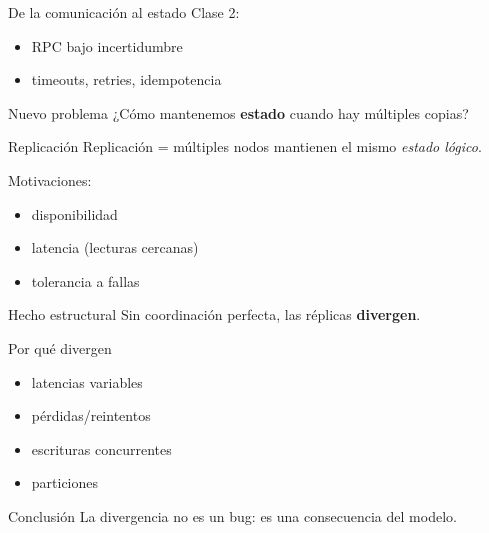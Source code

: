 \documentclass[institutional,screen,none]{ua-engineering-v6-beamer}
\title{\UACourse}
\subtitle{Clase 03 --- Consistencia, replicación y modelos de estado}
\author{\UAProfessor}
\date{\UADate}
\begin{document}
{
\begin{frame}[plain]
\titlepage
\end{frame}
}


\begin{frame}{De la comunicación al estado}
Clase 2:
\begin{itemize}
\item RPC bajo incertidumbre
\item timeouts, retries, idempotencia
\end{itemize}

\pause

\begin{block}{Nuevo problema}
¿Cómo mantenemos \textbf{estado} cuando hay múltiples copias?
\end{block}
\end{frame}

\begin{frame}{Replicación}
Replicación = múltiples nodos mantienen el mismo \emph{estado lógico}.

\pause
Motivaciones:
\begin{itemize}
\item disponibilidad
\item latencia (lecturas cercanas)
\item tolerancia a fallas
\end{itemize}

\pause
\begin{alertblock}{Hecho estructural}
Sin coordinación perfecta, las réplicas \textbf{divergen}.
\end{alertblock}
\end{frame}

\begin{frame}{Por qué divergen}
\begin{itemize}
\item latencias variables
\item pérdidas/reintentos
\item escrituras concurrentes
\item particiones
\end{itemize}

\pause
\begin{block}{Conclusión}
La divergencia no es un bug: es una consecuencia del modelo.
\end{block}
\end{frame}
\end{document}
